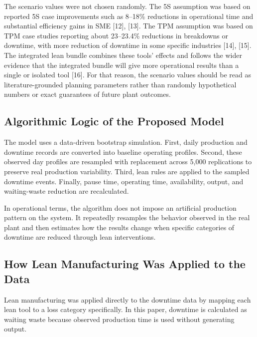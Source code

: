 \documentclass[12pt,a4paper]{article}
\begin{document}
The scenario values were not chosen randomly. The 5S assumption was based on reported 5S case improvements such as 8--18\% reductions in operational time and substantial efficiency gains in SME [12], [13]. The TPM assumption was based on TPM case studies reporting about 23--23.4\% reductions in breakdowns or downtime, with more reduction of downtime in some specific industries [14], [15]. The integrated lean bundle combines these tools' effects and follows the wider evidence that the integrated bundle will give more operational results than a single or isolated tool [16]. For that reason, the scenario values should be read as literature-grounded planning parameters rather than randomly hypothetical numbers or exact guarantees of future plant outcomes.

\subsection{Algorithmic Logic of the Proposed Model}
The model uses a data-driven bootstrap simulation. First, daily production and downtime records are converted into baseline operating profiles. Second, these observed day profiles are resampled with replacement across 5,000 replications to preserve real production variability. Third, lean rules are applied to the sampled downtime events. Finally, pause time, operating time, availability, output, and waiting-waste reduction are recalculated.

In operational terms, the algorithm does not impose an artificial production pattern on the system. It repeatedly resamples the behavior observed in the real plant and then estimates how the results change when specific categories of downtime are reduced through lean interventions.

\subsection{How Lean Manufacturing Was Applied to the Data}
Lean manufacturing was applied directly to the downtime data by mapping each lean tool to a loss category specifically. In this paper, downtime is calculated as waiting waste because observed production time is used without generating output.
\end{document}
